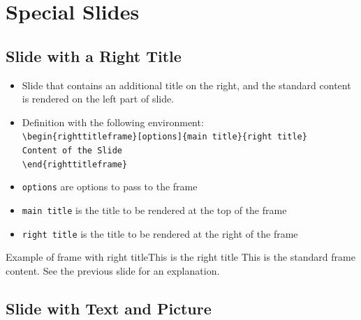 \documentclass[english,sectioncirclenumberstyle]{ciadbeamer}
\begin{document}
\section{Special Slides}
\sectiontableofcontentslide

\subsection{Slide with a Right Title}

\begin{frame}{\subsecname}
	\begin{itemize}
	\item Slide that contains an additional title on the right, and the standard content is rendered on the left part of slide.
	\item Definition with the following environment: \\
		\texttt{{\textbackslash}begin\{righttitleframe\}[options]\{main title\}\{right title\}} \\
		\texttt{Content of the Slide} \\
		\texttt{{\textbackslash}end\{righttitleframe\}}
	\item \texttt{options} are options to pass to the frame
	\item \texttt{main title} is the title to be rendered at the top of the frame
	\item \texttt{right title} is the title to be rendered at the right of the frame
	\end{itemize}
\end{frame}

\begin{righttitleframe}{Example of frame with right title}{This is the right title}
	This is the standard frame content. See the previous slide for an explanation.
\end{righttitleframe}

\subsection{Slide with Text and Picture}
\end{document}
